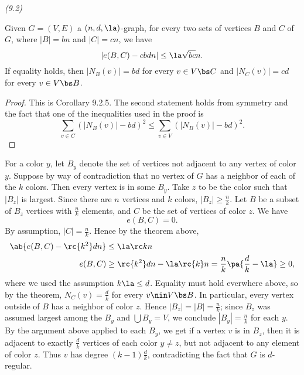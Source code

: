 \begin{problem}{\it (9.2)}
\begin{thm}[Corollary 9.2.5]
Given $G=(V,E)$ a $(n,d,\la)$-graph, for every two sets of vertices $B$ and $C$ of $G$, where $|B|=bn$ and $|C|=cn$, we have
\[
|e(B,C)-cbdn|\le \la\sqrt{bc}n.
\]
If equality holds, then $|N_B(v)|=bd$ for every $v\in V\bs C$ and $|N_C(v)|=cd$ for every $v\in V\bs B$.
\end{thm}
\begin{proof}
This is Corollary 9.2.5. The second statement holds from symmetry and the fact that one of the inequalities used in the proof is
\[
\sum_{v\in C}(|N_B(v)|-bd)^2\le\sum_{v\in V}(|N_B(v)|-bd)^2.
\]
\end{proof}
For a color $y$, let $B_y$ denote the set of vertices not adjacent to any vertex of color $y$. 
Suppose by way of contradiction that no vertex of $G$ has a neighbor of each of the $k$ colors. 
Then every vertex is in some $B_y$. Take $z$ to be the color such that $|B_z|$ is largest. Since there are $n$ vertices and $k$ colors, $|B_z|\ge \frac{n}{k}$. 
Let $B$ be a subset of $B_z$ vertices with $\frac{n}{k}$ elements, and $C$ be the set of vertices of color $z$. 
We have
\[e(B,C)=0.\]
By assumption, $|C|=\frac nk$. Hence by the theorem above,
\begin{align*}
\ab{e(B,C)-\rc{k^2} dn}&\le \la\rc k n\\
e(B,C)&\ge \rc{k^2}dn-\la\rc{k}n=\frac nk \pa{\frac dk-\la}\ge 0,
\end{align*}
where we used the assumption $k\la \le d$. Equality must hold everwhere above, so by the theorem, $N_C(v)=\frac dk$ for every $v\nin V\bs B$. In particular, every vertex outside of $B$ has a neighbor of color $z$. Hence $|B_z|=|B|=\frac nk$; since $B_z$ was assumed largest among the $B_y$ and $\bigcup B_y=V$, we conclude $|B_y|=\frac nk$ for each $y$. By the argument above applied to each $B_y$, we get if a vertex $v$ is in $B_z$, then it is adjacent to exactly $\frac dk$ vertices of each color $y\ne z$, but not adjacent to any element of color $z$. Thus $v$ has degree $(k-1)\frac dk$, contradicting the fact that $G$ is $d$-regular.
\end{problem}
